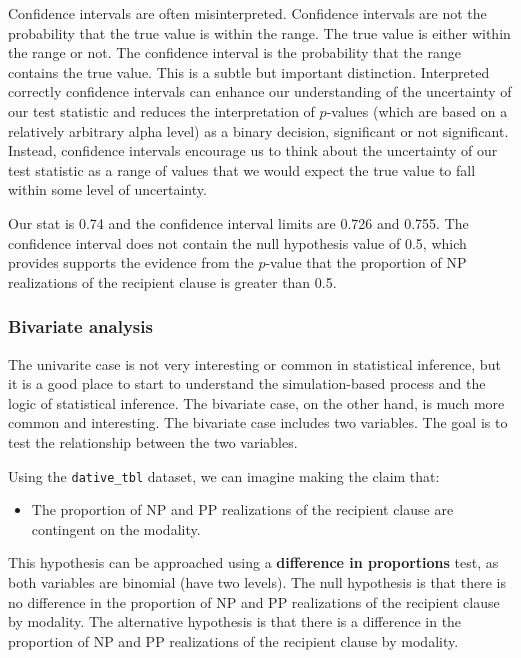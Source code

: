 \documentclass[
  letterpaper,
  krantz1]{latex/krantz-mod}
\providecommand{\tightlist}{%
  \setlength{\itemsep}{0pt}\setlength{\parskip}{0pt}}\usepackage{longtable,booktabs,array}
\theoremstyle{definition}
\theoremstyle{definition}
\theoremstyle{remark}
\begin{document}
Confidence intervals are often misinterpreted. Confidence intervals are
not the probability that the true value is within the range. The true
value is either within the range or not. The confidence interval is the
probability that the range contains the true value. This is a subtle but
important distinction. Interpreted correctly confidence intervals can
enhance our understanding of the uncertainty of our test statistic and
reduces the interpretation of \(p\)-values (which are based on a
relatively arbitrary alpha level) as a binary decision, significant or
not significant. Instead, confidence intervals encourage us to think
about the uncertainty of our test statistic as a range of values that we
would expect the true value to fall within some level of uncertainty.

Our stat is 0.74 and the confidence interval limits are 0.726 and 0.755.
The confidence interval does not contain the null hypothesis value of
0.5, which provides supports the evidence from the \(p\)-value that the
proportion of NP realizations of the recipient clause is greater than
0.5.

\subsubsection{Bivariate analysis}\label{sec-infer-cat-bivariate}

The univarite case is not very interesting or common in statistical
inference, but it is a good place to start to understand the
simulation-based process and the logic of statistical inference. The
bivariate case, on the other hand, is much more common and interesting.
The bivariate case includes two variables. The goal is to test the
relationship between the two variables.

Using the \texttt{dative\_tbl} dataset, we can imagine making the claim
that:

\begin{itemize}
\tightlist
\item
  The proportion of NP and PP realizations of the recipient clause are
  contingent on the modality.
\end{itemize}

This hypothesis can be approached using a \textbf{difference in
proportions} test, as both variables are binomial (have two levels). The
null hypothesis is that there is no difference in the proportion of NP
and PP realizations of the recipient clause by modality. The alternative
hypothesis is that there is a difference in the proportion of NP and PP
realizations of the recipient clause by modality.
\end{document}
